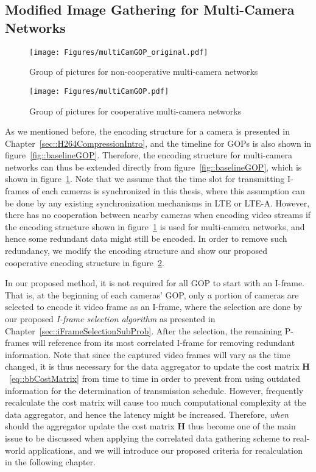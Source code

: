 {\subsection{Modified Image Gathering for Multi-Camera Networks}
%
\begin{figure}
\begin{center}
\texttt{[image: Figures/multiCamGOP\_original.pdf]}
\caption{\label{fig::multiCamGOP_original}Group of pictures for non-cooperative multi-camera networks}
\end{center}
\end{figure}
%
\begin{figure}
\begin{center}
\texttt{[image: Figures/multiCamGOP.pdf]}
\caption{\label{fig::multiCamGOP}Group of pictures for cooperative multi-camera networks}
\end{center}
\end{figure}
%
As we mentioned before, the encoding structure for a camera is presented in Chapter~\ref{sec::H264CompressionIntro}, and the timeline for GOPs is also shown in figure~\ref{fig::baselineGOP}.
Therefore, the encoding structure for multi-camera networks can thus be extended directly from figure~\ref{fig::baselineGOP}, which is shown in figure~\ref{fig::multiCamGOP_original}.
Note that we assume that the time slot for transmitting I-frames of each cameras is synchronized in this thesis, where this assumption can be done by any existing synchronization mechanisms in LTE or LTE-A.
However, there has no cooperation between nearby cameras when encoding video streams if the encoding structure shown in figure~\ref{fig::multiCamGOP_original} is used for multi-camera networks, and hence some redundant data might still be encoded.
In order to remove such redundancy, we modify the encoding structure and show our proposed cooperative encoding structure in figure~\ref{fig::multiCamGOP}.

In our proposed method, it is not required for all GOP to start with an I-frame.
That is, at the beginning of each cameras' GOP, only a portion of cameras are selected to encode it video frame as an I-frame, where the selection are done by our proposed \emph{I-frame selection algorithm} as presented in Chapter~\ref{sec::iFrameSelectionSubProb}.
After the selection, the remaining P-frames will reference from its most correlated I-frame for removing redundant information.
Note that since the captured video frames will vary as the time changed, it is thus necessary for the data aggregator to update the cost matrix $\mathbf{H}$~\eqref{eq::bbCostMatrix} from time to time in order to prevent from using outdated information for the determination of transmission schedule.
However, frequently recalculate the cost matrix will cause too much computational complexity at the data aggregator, and hence the latency might be increased.
Therefore, \emph{when} should the aggregator update the cost matrix $\mathbf{H}$ thus become one of the main issue to be discussed when applying the correlated data gathering scheme to real-world applications, and we will introduce our proposed criteria for recalculation in the following chapter.
%
}
